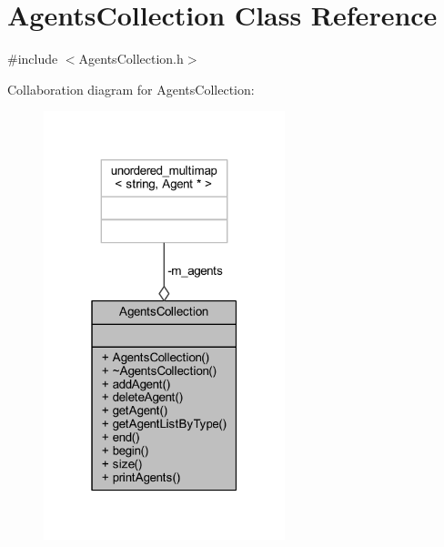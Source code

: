\hypertarget{class_agents_collection}{}\section{Agents\+Collection Class Reference}
\label{class_agents_collection}


{\ttfamily \#include $<$Agents\+Collection.\+h$>$}



Collaboration diagram for Agents\+Collection\+:\nopagebreak
\begin{figure}[H]
\begin{center}
\leavevmode
\includegraphics[width=199pt]{class_agents_collection__coll__graph}
\end{center}
\end{figure}
